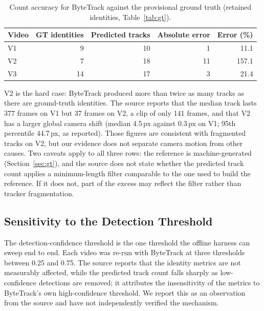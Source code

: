 \documentclass[11pt]{article}
\newif\ifnotes  \notesfalse
\newcommand{\authorcheck}[1]{\ifnotes{\color{red}\textbf{[Author check:} #1\textbf{]}}\fi}
\begin{document}
\begin{table}[htbp]
\centering
\small
\caption{Count accuracy for ByteTrack against the provisional ground truth (retained identities, Table~\ref{tab:gt}).}
\label{tab:counting}
\begin{tabular}{lrrrr}
\toprule
\textbf{Video} & \textbf{GT identities} & \textbf{Predicted tracks} & \textbf{Absolute error} & \textbf{Error (\%)} \\
\midrule
V1 & 9  & 10 & 1  & 11.1  \\
V2 & 7  & 18 & 11 & 157.1 \\
V3 & 14 & 17 & 3  & 21.4  \\
\bottomrule
\end{tabular}
\end{table}

V2 is the hard case: ByteTrack produced more than twice as many tracks as there are ground-truth identities. The source reports that the median track lasts 377 frames on V1 but 37 frames on V2, a clip of only 141 frames, and that V2 has a larger global camera shift (median 4.5\,px against 0.3\,px on V1; 95th percentile 44.7\,px, as reported). Those figures are consistent with fragmented tracks on V2, but our evidence does not separate camera motion from other causes. Two caveats apply to all three rows: the reference is machine-generated (Section~\ref{sec:gt}), and the source does not state whether the predicted track count applies a minimum-length filter comparable to the one used to build the reference. If it does not, part of the excess may reflect the filter rather than tracker fragmentation.

\subsection{Sensitivity to the Detection Threshold}

The detection-confidence threshold is the one threshold the offline harness can sweep end to end. Each video was re-run with ByteTrack at three thresholds between 0.25 and 0.75. The source reports that the identity metrics are not measurably affected, while the predicted track count falls sharply as low-confidence detections are removed; it attributes the insensitivity of the metrics to ByteTrack's own high-confidence threshold. We report this as an observation from the source and have not independently verified the mechanism. \authorcheck{the source text describes ByteTrack only, whereas the figure caption says both trackers were swept.}
\end{document}
